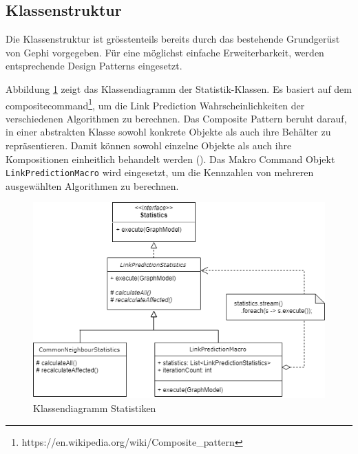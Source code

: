 \subsection{Klassenstruktur}
Die Klassenstruktur ist grösstenteils bereits durch das bestehende Grundgerüst von Gephi vorgegeben. Für eine möglichst einfache Erweiterbarkeit, werden entsprechende Design Patterns eingesetzt.

Abbildung \ref{fig:class_statistic} zeigt das Klassendiagramm der Statistik-Klassen. Es basiert auf dem \acs{compositecommand}\footnote{https://en.wikipedia.org/wiki/Composite\_pattern}, um die Link Prediction Wahrscheinlichkeiten der verschiedenen Algorithmen zu berechnen. Das Composite Pattern beruht darauf, in einer abstrakten Klasse sowohl konkrete Objekte als auch ihre Behälter zu repräsentieren. Damit können sowohl einzelne Objekte als auch ihre Kompositionen einheitlich behandelt werden (\cite{noauthor_kompositum_2019}). Das Makro Command Objekt \texttt{LinkPredictionMacro} wird eingesetzt, um die Kennzahlen von mehreren ausgewählten Algorithmen zu berechnen.
\begin{figure}
    \centering
    \includegraphics[width=\linewidth]{resources/class_Statistic.png}
    \caption{Klassendiagramm Statistiken}
    \label{fig:class_statistic}
\end{figure}

